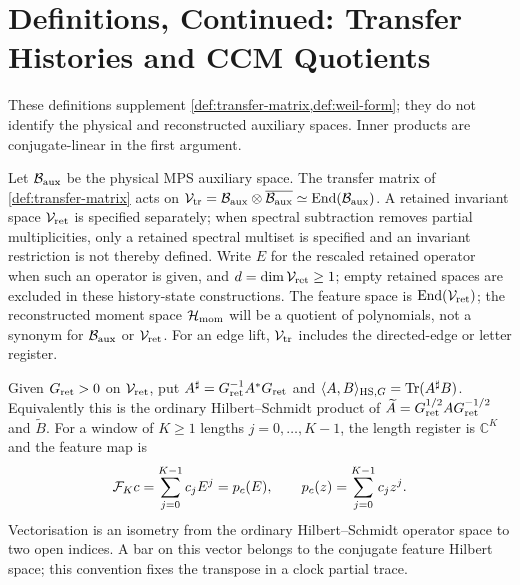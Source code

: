 
\section{Definitions, Continued: Transfer Histories and CCM Quotients}
\label{sec:definitions-ccm-tensor}

These definitions supplement \cref{def:transfer-matrix,def:weil-form};
they do not identify the physical and reconstructed auxiliary spaces.
Inner products are conjugate-linear in the first argument.

\begin{definition}
\label{def:ccm-tn-spaces}
Let $\mathcal B_{\mathrm{aux}}$ be the physical MPS auxiliary space. The transfer matrix of
\cref{def:transfer-matrix} acts on
$\mathcal V_{\mathrm{tr}}=\mathcal B_{\mathrm{aux}}\otimes\overline{\mathcal B_{\mathrm{aux}}}\simeq\operatorname{End}(\mathcal B_{\mathrm{aux}})$.
A retained invariant space $\mathcal V_{\mathrm{ret}}$ is specified separately; when spectral
subtraction removes partial multiplicities, only a retained spectral multiset
is specified and an invariant restriction is not thereby defined.
Write $E$ for the rescaled retained operator when such an operator is given,
and $d=\dim\mathcal V_{\mathrm{ret}}\geq1$; empty retained spaces are excluded in these
history-state constructions. The feature space is
$\operatorname{End}(\mathcal V_{\mathrm{ret}})$; the reconstructed moment space $\mathcal H_{\mathrm{mom}}$
will be a quotient of polynomials, not a synonym for $\mathcal B_{\mathrm{aux}}$ or $\mathcal V_{\mathrm{ret}}$.
For an edge lift, $\mathcal V_{\mathrm{tr}}$ includes the directed-edge or letter register.
\end{definition}

\begin{definition}
\label{def:ccm-tn-feature}
Given $G_{\mathrm{ret}}>0$ on $\mathcal V_{\mathrm{ret}}$, put
$A^{\sharp}=G_{\mathrm{ret}}^{-1}A^*G_{\mathrm{ret}}$ and
$\langle A,B\rangle_{\mathrm{HS},G}=\operatorname{Tr}(A^\sharp B)$.
Equivalently this is the ordinary Hilbert--Schmidt product of
$\widetilde A=G_{\mathrm{ret}}^{1/2}AG_{\mathrm{ret}}^{-1/2}$ and $\widetilde B$.
For a window of $K\geq1$ lengths $j=0,\ldots,K-1$, the length register is
$\mathbb C^K$ and the feature map is
\[
 \mathcal F_K c=\sum_{j=0}^{K-1}c_jE^j=p_c(E),\qquad
 p_c(z)=\sum_{j=0}^{K-1}c_jz^j.
\]
Vectorisation is an isometry from the ordinary Hilbert--Schmidt operator
space to two open indices. A bar on this vector belongs to the conjugate
feature Hilbert space; this convention fixes the transpose in a clock
partial trace.
\end{definition}

